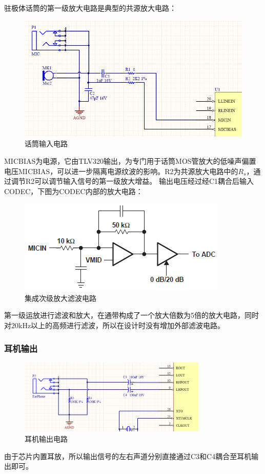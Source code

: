 \documentclass[16pt,a4paper]{article}
\begin{document}
驻极体话筒的第一级放大电路是典型的共源放大电路：

\begin{figure}[H]
\centering
\includegraphics[scale = 0.8]{Mic2.png}
\caption{话筒输入电路} 
\end{figure}

MICBIAS为电源，它由TLV320输出，为专门用于话筒MOS管放大的低噪声偏置电压MICBIAS，可以进一步隔离电源纹波的影响。R2为共源放大电路中的$R_{s}$，通过调节R2可以调节输入信号的第一级放大增益。
输出电压经过经C1耦合后输入CODEC，下图为CODEC内部的放大电路：
\begin{figure}[H]
\centering
\includegraphics[scale = 1]{Mic1.png}
\caption{集成次级放大滤波电路} 
\end{figure}
第一级运放进行滤波和放大，在通带构成了一个放大倍数为5倍的放大电路，同时对20kHz以上的高频进行滤波，所以在设计时没有增加外部滤波电路。

\subsubsection{耳机输出}
\begin{figure}[H]
\centering
\includegraphics[width=0.8\textwidth]{EarPhone.png}
\caption{耳机输出电路} 
\end{figure}
由于芯片内置耳放，所以输出信号的左右声道分别直接通过C3和C4耦合至耳机输出即可。
\end{document}
